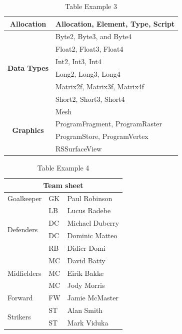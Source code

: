 \begin{table}[htpb]\begin{center}
	\label{t:prefix-table}
	\caption{Table Example 3}
	\renewcommand{\arraystretch}{1.0}
	\begin{tabularx}{300pt}{|c|X| }
		\hline
		\multirow{1}{*}{\textbf{Allocation}} &
		Allocation, Element, Type, Script 
		\\ \hline\hline
		\multirow{6}{*}{\textbf{Data Types}} &
        Byte2, Byte3, and Byte4\\ &
        Float2, Float3, Float4\\ &
        Int2, Int3, Int4\\ &
        Long2, Long3, Long4\\ &
        Matrix2f, Matrix3f, Matrix4f\\ &
        Short2, Short3, Short4
        \\ \hline\hline
		\multirow{4}{*}{\textbf{Graphics}} &
		Mesh\\&
		ProgramFragment, ProgramRaster\\&
		ProgramStore, ProgramVertex\\&
		RSSurfaceView
		\\ \hline
	\end{tabularx}
\end{center}\end{table}

\begin{table}[htpb]\begin{center}
\caption{Table Example 4}
\begin{tabular}{|l|l|l|}
\hline
\multicolumn{3}{|c|}{Team sheet} \\
\hline
Goalkeeper & GK & Paul Robinson \\ \hline
\multirow{4}{*}{Defenders} & LB & Lucus Radebe \\
 & DC & Michael Duberry \\
 & DC & Dominic Matteo \\
 & RB & Didier Domi \\ \hline
\multirow{3}{*}{Midfielders} & MC & David Batty \\
 & MC & Eirik Bakke \\
 & MC & Jody Morris \\ \hline
Forward & FW & Jamie McMaster \\ \hline
\multirow{2}{*}{Strikers} & ST & Alan Smith \\
 & ST & Mark Viduka \\
\hline
\end{tabular}
 \end{center}\end{table}
 
